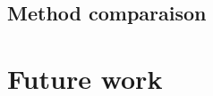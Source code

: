 \documentclass[t]{beamer}
\begin{document}
{	\subsection{Method comparaison}
	{
		\frame[t]
		{
		}
	}
}

\section{Future work}
{
}


%
\end{document}
